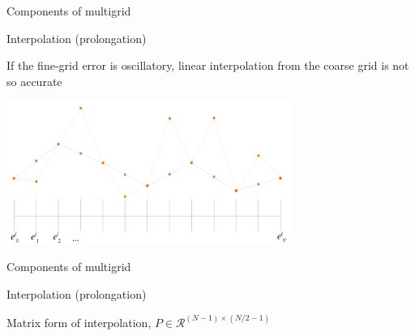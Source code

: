 \documentclass[18pt,xcolor=table]{beamer}
\begin{document}
\begin{frame}{Components of multigrid}
\begin{block}{Interpolation (prolongation)}
\bit
\item If the fine-grid error is oscillatory, linear interpolation from the coarse grid is not so accurate
\eit
\end{block}
\begin{center}
\includegraphics[width=0.7\textwidth]{../figures/coarseCorrectionOscillatory}
\end{center}
\end{frame}

\begin{frame}{Components of multigrid}
\begin{block}{Interpolation (prolongation)}
\bit
\item Matrix form of interpolation, $P\in\mathcal{R}^{(N-1)\times(N/2-1)}$
\eit
{}
\end{block}
\end{frame}
\end{document}
